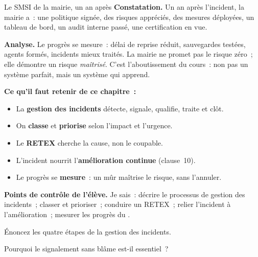 \begin{boxobjet}{Le SMSI de la mairie, un an après}
\textbf{Constatation.} Un an après l'incident, la mairie a~: une politique
signée, des risques appréciés, des mesures déployées, un tableau de bord, un
audit interne passé, une certification en vue.

\medskip
\textbf{Analyse.} Le progrès se mesure~: délai de reprise réduit, sauvegardes
testées, agents formés, incidents mieux traités. La mairie ne promet pas le
risque zéro~; elle démontre un risque \emph{maîtrisé}. C'est l'aboutissement du
cours~: non pas un système parfait, mais un système qui apprend.
\end{boxobjet}

\separateur

\begin{boxresume}
\textbf{Ce qu'il faut retenir de ce chapitre~:}
\begin{itemize}
    \item La \textbf{gestion des incidents} détecte, signale, qualifie, traite
          et clôt.
    \item On \textbf{classe} et \textbf{priorise} selon l'impact et l'urgence.
    \item Le \textbf{RETEX} cherche la cause, non le coupable.
    \item L'incident nourrit l'\textbf{amélioration continue} (clause~10).
    \item Le progrès se \textbf{mesure}~: un  mûr maîtrise le
          risque, sans l'annuler.
\end{itemize}
\end{boxresume}

\begin{boxinfo}
\textbf{Points de contrôle de l'élève.} Je sais~: décrire le processus de
gestion des incidents~; classer et prioriser~; conduire un RETEX~; relier
l'incident à l'amélioration~; mesurer les progrès du .
\end{boxinfo}

\bigskip

\begin{boxexo}[title={\ding{45}\quad Exercice~20.1. Le processus \niveaubase}]
Énoncez les quatre étapes de la gestion des incidents.
\end{boxexo}

\begin{boxexo}[title={\ding{45}\quad Exercice~20.2. Signaler \niveaubase}]
Pourquoi le signalement sans blâme est-il essentiel~?
\end{boxexo}

